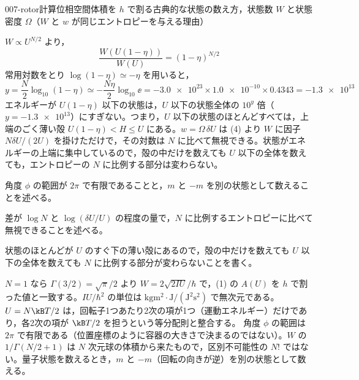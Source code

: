 \documentclass[uplatex,dvipdfmx,a4paper,11pt]{jsarticle}
\begin{document}
\begin{mondai}{007-rotor}{計算}{位相空間体積を $h$ で割る古典的な状態の数え方，状態数 $W$ と状態密度 $\Omega$（$W$ と $w$ が同じエントロピーを与える理由）}
\begin{tadashii}
 $W\propto U^{N/2}$ より，
\[\frac{W(U(1-\eta))}{W(U)}=(1-\eta)^{N/2}\]
常用対数をとり $\log(1-\eta)\simeq-\eta$ を用いると，
\[y=\frac{N}{2}\log_{10}(1-\eta)\simeq-\frac{N\eta}{2}\log_{10}\ee=-\num{3.0e23}\times\num{1.0e-10}\times\num{0.4343}=-\num{1.3e13}\]
エネルギーが $U(1-\eta)$ 以下の状態は，$U$ 以下の状態全体の $10^{y}$ 倍（$y=-\num{1.3e13}$）にすぎない。つまり，$U$ 以下の状態のほとんどすべては，上端のごく薄い殻 $U(1-\eta)<H\le U$ にある。$w=\Omega\,\delta U$ は (4) より $W$ に因子 $N\delta U/(2U)$ を掛けただけで，その対数は $N$ に比べて無視できる。状態がエネルギーの上端に集中しているので，殻の中だけを数えても $U$ 以下の全体を数えても，エントロピーの $N$ に比例する部分は変わらない。
\begin{ronten}
  \item {} 角度 $\phi$ の範囲が $2\pi$ で有限であることと，$m$ と $-m$ を別の状態として数えることを述べる。
  \item {} 差が $\log N$ と $\log(\delta U/U)$ の程度の量で，$N$ に比例するエントロピーに比べて無視できることを述べる。
  \item {} 状態のほとんどが $U$ のすぐ下の薄い殻にあるので，殻の中だけを数えても $U$ 以下の全体を数えても $N$ に比例する部分が変わらないことを書く。
\end{ronten}
\kenzan $N=1$ なら $\Gamma(3/2)=\sqrt{\pi}/2$ より $W=2\sqrt{2IU}/\hbar$ で，(1) の $A(U)$ を $h$ で割った値と一致する。$IU/\hbar^{2}$ の単位は $\unit{\kilogram\metre\squared}\cdot\unit{\joule}/(\unit{\joule\squared\second\squared})$ で無次元である。$U=N\kB T/2$ は，回転子1つあたり2次の項が1つ（運動エネルギー）だけであり，各2次の項が $\kB T/2$ を担うという等分配則と整合する。
\tsumazuki 角度 $\phi$ の範囲は $2\pi$ で有限である（位置座標のように容器の大きさで決まるのではない）。$W$ の $1/\Gamma(N/2+1)$ は $N$ 次元球の体積から来たもので，区別不可能性の $N!$ ではない。量子状態を数えるとき，$m$ と $-m$（回転の向きが逆）を別の状態として数える。
\end{tadashii}
\end{mondai}

\noteowari
\end{document}
